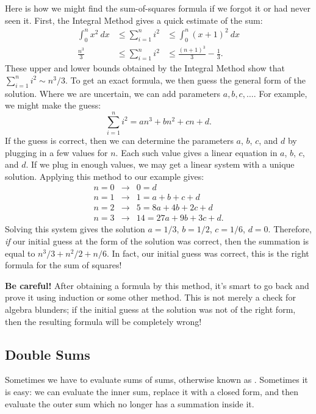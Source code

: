 Here is how we might find the sum-of-squares formula if we forgot it
or had never seen it.  First, the Integral Method gives a quick
estimate of the sum:
\[\begin{array}{}
\int_0^n x^2 \ dx & \leq \sum_{i=1}^n i^2 & \leq \int_0^n (x+1)^2 \ dx\\
\frac{n^3}{3}     & \leq \sum_{i=1}^n i^2 & \leq \frac{(n+1)^3}{3} - \frac{1}{3}. 
\end{array}\]
These upper and lower bounds obtained by the Integral Method show that
$\sum_{i=1}^n i^2 \sim n^3/3$.  To get an exact formula, we
then guess the general form of the solution.  Where we are uncertain,
we can add parameters $a, b, c, \dots$.  For example, we might make
the guess:
\[
\sum_{i=1}^n i^2 = an^3 + bn^2 + cn + d.
\]
If the guess is correct, then we can determine the parameters $a$,
$b$, $c$, and $d$ by plugging in a few values for $n$.  Each such
value gives a linear equation in $a$, $b$, $c$, and $d$.  If we plug
in enough values, we may get a linear system with a unique solution.
Applying this method to our example gives:
\begin{eqnarray*}
n = 0 & \rightarrow & 0 = d \\
n = 1 & \rightarrow & 1 = a + b + c + d \\
n = 2 & \rightarrow & 5 = 8a + 4b + 2c + d \\
n = 3 & \rightarrow & 14 = 27a + 9b + 3c + d.
\end{eqnarray*}
Solving this system gives the solution $a = 1/3$, $b = 1/2$, $c = 1/6$, $d
= 0$.  Therefore, \emph{if} our initial guess at the form of the solution
was correct, then the summation is equal to $n^3/3 + n^2/2 + n/6$.  In
fact, our initial guess was correct, this is the right formula for the sum
of squares!

\textbf{Be careful!}  After obtaining a formula by this method, it's smart
to go back and prove it using induction or some other method.  This is not
merely a check for algebra blunders; if the initial guess at the solution
was not of the right form, then the resulting formula will be completely
wrong!

\subsection{Double Sums}

Sometimes we have to evaluate sums of sums, otherwise known as
.  Sometimes it is easy: we can evaluate the inner
sum, replace it with a closed form, and then evaluate the outer sum which
no longer has a summation inside it.


